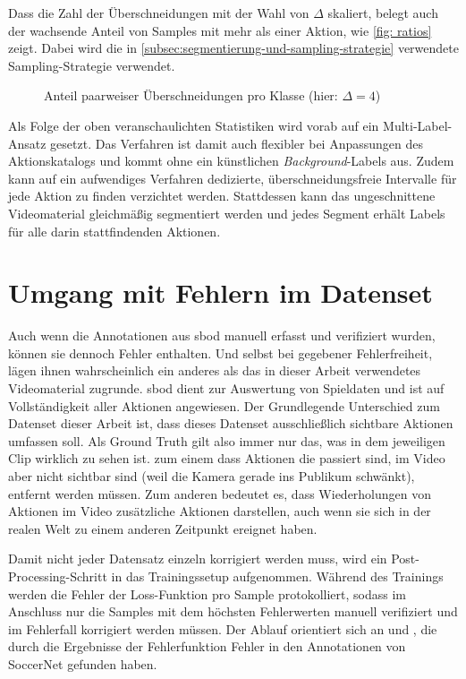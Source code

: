 Dass die Zahl der Überschneidungen mit der Wahl von $\Delta$ skaliert, belegt auch der wachsende Anteil von Samples mit mehr als einer Aktion, wie \autoref{fig: ratios} zeigt.
Dabei wird die in \autoref{subsec:segmentierung-und-sampling-strategie} verwendete Sampling-Strategie verwendet.

\begin{figure}
    \centering
    \caption{Anteil paarweiser Überschneidungen pro Klasse (hier: $\Delta = 4$)}
    \label{fig:overlaps}
\end{figure}

Als Folge der oben veranschaulichten Statistiken wird vorab auf ein Multi-Label-Ansatz gesetzt.
Das Verfahren ist damit auch flexibler bei Anpassungen des Aktionskatalogs und kommt ohne ein künstlichen \emph{Background}-Labels aus.
Zudem kann auf ein aufwendiges Verfahren dedizierte, überschneidungsfreie Intervalle für jede Aktion zu finden verzichtet werden.
Stattdessen kann das ungeschnittene Videomaterial gleichmäßig segmentiert werden und jedes Segment erhält Labels für alle darin stattfindenden Aktionen.

\section{Umgang mit Fehlern im Datenset}
\label{sec:umgang-mit-fehlern-in-datenset}

Auch wenn die Annotationen aus \gls{sbod} manuell erfasst und verifiziert wurden, können sie dennoch Fehler enthalten.
Und selbst bei gegebener Fehlerfreiheit, lägen ihnen wahrscheinlich ein anderes als das in dieser Arbeit verwendetes Videomaterial zugrunde.
\gls{sbod} dient zur Auswertung von Spieldaten und ist auf Vollständigkeit aller Aktionen angewiesen.
Der Grundlegende Unterschied zum Datenset dieser Arbeit ist, dass dieses Datenset ausschließlich sichtbare Aktionen umfassen soll.
Als Ground Truth gilt also immer nur das, was in dem jeweiligen Clip wirklich zu sehen ist.
\Dh zum einem dass Aktionen die passiert sind, im Video aber nicht sichtbar sind (\zB weil die Kamera gerade ins Publikum schwänkt), entfernt werden müssen.
Zum anderen bedeutet es, dass Wiederholungen von Aktionen im Video zusätzliche Aktionen darstellen, auch wenn sie sich in der realen Welt zu einem anderen Zeitpunkt ereignet haben.

Damit nicht jeder Datensatz einzeln korrigiert werden muss, wird ein Post-Processing-Schritt in das Trainingssetup aufgenommen.
Während des Trainings werden die Fehler der Loss-Funktion pro Sample protokolliert, sodass im Anschluss nur die Samples mit dem höchsten Fehlerwerten manuell verifiziert und im Fehlerfall korrigiert werden müssen.
Der Ablauf orientiert sich an \cite{Gugger20} und \cite{Cioppa20}, die durch die Ergebnisse der Fehlerfunktion Fehler in den Annotationen von SoccerNet gefunden haben.

